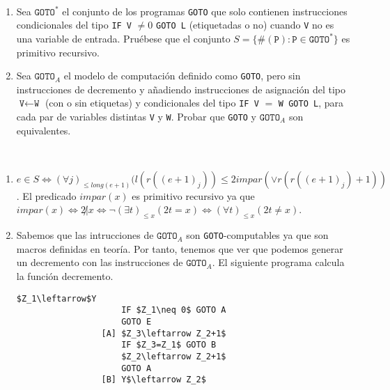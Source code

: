 \documentclass[twoside]{article}
\begin{document}
\newpage

\begin{ejercicio}{3}
\end{ejercicio}\
\begin{enumerate}
\item Sea $\texttt{GOTO}^*$ el conjunto de los programas \texttt{GOTO} que solo contienen instrucciones condicionales
del tipo \texttt{IF V} $\neq 0$ \texttt{GOTO L} (etiquetadas o no) cuando \texttt{V} no es una variable de
entrada. Pruébese que el conjunto $S = \{\#(\texttt{P}) : \texttt{P} \in \texttt{GOTO}^*\}$ es primitivo recursivo.

\item Sea $\texttt{GOTO}_A$ el modelo de computación definido como \texttt{GOTO}, pero sin instrucciones de
decremento y añadiendo instrucciones de asignación del tipo $\texttt{V}\leftarrow \texttt{W}$ (con o sin etiquetas)
y condicionales del tipo \texttt{IF V} $=$ \texttt{W GOTO L}, para cada par de variables distintas \texttt{V} y \texttt{W}.
Probar que \texttt{GOTO} y $\texttt{GOTO}_A$ son equivalentes.
\end{enumerate}
\begin{solucion}\
\begin{enumerate}
\item $e\in S\Leftrightarrow (\forall j)_{\leq long(e+1)}(l(r((e+1)_j))\leq 2 impar(\lor r(r((e+1)_j)+1))$. El predicado $impar(x)$ es primitivo recursivo ya que $impar(x)\Leftrightarrow 2\not| x\Leftrightarrow \neg (\exists t)_{\leq x}(2t=x)\Leftrightarrow (\forall t)_{\leq x}(2t\neq x)$. 
\item Sabemos que las intrucciones de $\texttt{GOTO}_A$ son \texttt{GOTO}-computables ya que son macros definidas en teoría. Por tanto, tenemos que ver que podemos generar un decremento con las instrucciones de $\texttt{GOTO}_A$. El siguiente programa calcula la función decremento.
\begin{lstlisting}[mathescape=true]
                     $Z_1\leftarrow$Y
                     IF $Z_1\neq 0$ GOTO A
                     GOTO E
                 [A] $Z_3\leftarrow Z_2+1$
                     IF $Z_3=Z_1$ GOTO B
                     $Z_2\leftarrow Z_2+1$
                     GOTO A
                 [B] Y$\leftarrow Z_2$  
\end{lstlisting}

\end{enumerate}
\end{solucion}

\newpage
\end{document}
